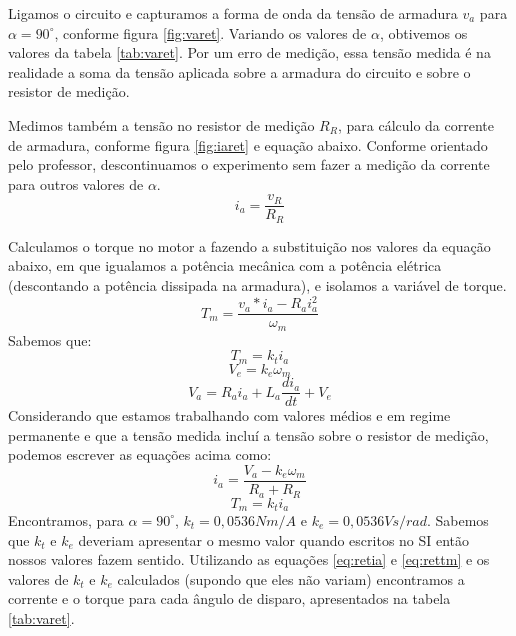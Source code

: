 \documentclass{article}
\begin{document}
Ligamos o circuito e capturamos a forma de onda da tensão de armadura $v_a$ para $\alpha=90^\circ$, conforme figura \ref{fig:varet}. Variando os valores de $\alpha$, obtivemos os valores da tabela \ref{tab:varet}. Por um erro de medição, essa tensão medida é na realidade a soma da tensão aplicada sobre a armadura do circuito e sobre o resistor de medição.

Medimos também a tensão no resistor de medição $R_R$, para cálculo da corrente de armadura, conforme figura \ref{fig:iaret} e equação abaixo. Conforme orientado pelo professor, descontinuamos o experimento sem fazer a medição da corrente para outros valores de $\alpha$. 
\begin{equation}
i_a=\frac{v_R}{R_R}
\end{equation}

Calculamos o torque no motor a fazendo a substituição nos valores da equação abaixo, em que igualamos a potência mecânica com a potência elétrica (descontando a potência dissipada na armadura), e isolamos a variável de torque.
\begin{equation}
T_m=\frac{v_a*i_a - R_a i_a^2}{\omega_m}
\label{eq:conserv}
\end{equation}
Sabemos que: 
\begin{equation}
T_m = k_t i_a
\end{equation}
\begin{equation}
V_e = k_e \omega_m
\end{equation}
\begin{equation}
V_a = R_a i_a + L_a\frac{di_a}{dt} + V_e
\end{equation}
Considerando que estamos trabalhando com valores médios e em regime permanente e que a tensão medida incluí a tensão sobre o resistor de medição, podemos escrever as equações acima como:
\begin{equation}
i_a = \frac{V_a - k_e\omega_m}{R_a + R_R}
\label{eq:retia}
\end{equation}
\begin{equation}
T_m = k_t i_a
\label{eq:rettm}
\end{equation}
Encontramos, para $\alpha = 90^\circ$, $k_t = 0,0536 N m/A$ e $k_e = 0,0536 V s/rad$. Sabemos que $k_t$ e $k_e$ deveriam apresentar o mesmo valor quando escritos no SI então nossos valores fazem sentido.
Utilizando as equações \ref{eq:retia} e \ref{eq:rettm} e os valores de $k_t$ e $k_e$ calculados (supondo que eles não variam) encontramos a corrente e o torque para cada ângulo de disparo, apresentados na tabela \ref{tab:varet}.
\end{document}
